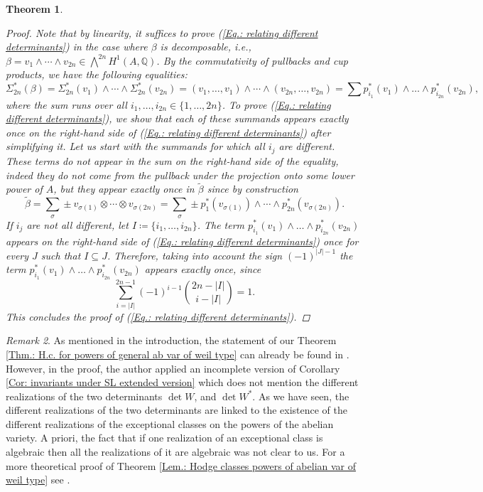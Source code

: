 \documentclass[11pt,twoside,a4paper]{amsart}
\newcommand{\0}{\mathscr{O}}
\newcommand{\Q}{\mathbb{Q}}
\newcommand{\s}{\sigma}
\theoremstyle{plain}
\newtheorem{thm}{Theorem}[section]
\theoremstyle{definition}
\theoremstyle{remark}
\newtheorem{rmk}[thm]{Remark}
\begin{document}
\begin{thm}
\begin{proof}
\smallskip
Note that by linearity, it suffices to prove
(\ref{Eq.: relating different determinants}) in the case where $\beta$ is decomposable, i.e., $\beta= v_1\wedge\cdots\wedge v_{2n}\in \bigwedge^{2n}H^1(A,\Q)$. 
By the commutativity of pullbacks and cup products, we have the following equalities:
\[
\Sigma_{2n}^*(\beta)=\Sigma^*_{2n}(v_1)\wedge\cdots\wedge \Sigma^*_{2n}(v_{2n})=(v_1,\ldots,v_1)\wedge\cdots\wedge (v_{2n},\ldots,v_{2n})=\textstyle \sum p_{i_1}^*(v_1)\wedge\ldots\wedge p_{i_{2n}}^*(v_{2n}),
\]
where the sum runs over all $i_1,\ldots,i_{2n}\in \{1,\ldots,2n\}$.
To prove (\ref{Eq.: relating different determinants}), we show that each of these summands appears exactly once on the right-hand side of (\ref{Eq.: relating different determinants}) after simplifying it. Let us start with the summands for which all $i_j$ are different. These terms do not appear in the sum on the right-hand side of the equality, indeed they do not come from the pullback under the projection onto some lower power of $A$, but they appear exactly once in $\widetilde{\beta}$ since by construction
\[
\textstyle
\widetilde{\beta}=\sum_\s \pm v_{\sigma(1)}\otimes\cdots\otimes v_{\sigma(2n)}=\sum_\s \pm p_1^*( v_{\sigma(1)})\wedge\cdots\wedge p_{2n}^*(v_{\sigma(2n)}).
\]
If $i_j$ are not all different, let $I\coloneqq\{i_1,\ldots,i_{2n}\}$. The term $ p_{i_1}^*(v_1)\wedge\ldots\wedge p_{i_{2n}}^*(v_{2n})$ appears on the right-hand side of (\ref{Eq.: relating different determinants}) once for every $J$ such that $I\subseteq J$. Therefore, taking into account the sign $(-1)^{|J|-1}$ the term $ p_{i_1}^*(v_1)\wedge\ldots\wedge p_{i_{2n}}^*(v_{2n})$ appears exactly once, since
\[
\sum_{i=|I|}^{2n-1} (-1)^{i-1}\binom{2n-|I|}{i-|I|}=1.
\]
This concludes the proof of (\ref{Eq.: relating different determinants}).

\end{proof}
\end{thm}

\begin{rmk}
\label{rmk.: comparison with Abdulali}
As mentioned in the introduction, the statement of our Theorem \ref{Thm.: H.c. for powers of general ab var of weil type} can already be found in \cite{abdulali1999abelianIII}.
However, in the proof, the author applied an incomplete version of Corollary \ref{Cor: invariants under SL extended version} which does not mention the different realizations of the two determinants $\det W$, and $\det W^*$. As we have seen, the different realizations of the two determinants are linked to the existence of the different realizations of the exceptional classes on the powers of the abelian variety. A priori, the fact that if one realization of an exceptional class is algebraic then all the realizations of it are algebraic was not clear to us.
For a more theoretical proof of Theorem \ref{Lem.: Hodge classes powers of abelian var of weil type} see \cite{milne2021tate}.
\end{rmk}
\end{document}
